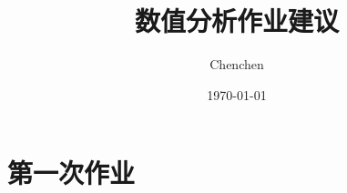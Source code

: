 \documentclass[UTF8]{ctexart}
\title{数值分析作业建议}
\author{Chenchen}
\date{\today}
\begin{document}
\maketitle

\section{第一次作业}
\end{document}
